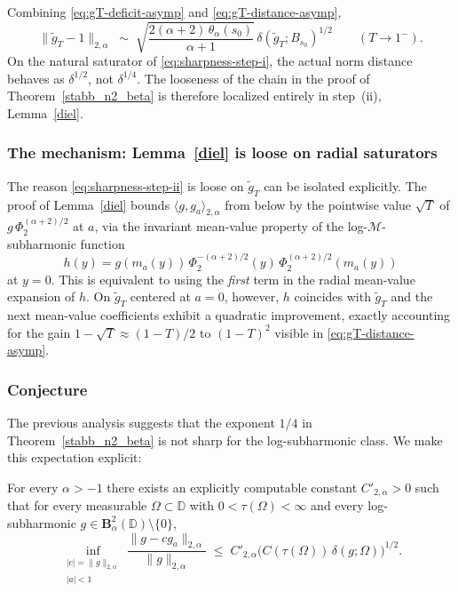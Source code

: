\documentclass[a4paper,10pt]{amsart}
\newcommand{\D}{\mathbb{D}}
\begin{document}
Combining \eqref{eq:gT-deficit-asymp} and \eqref{eq:gT-distance-asymp},
\[
\|\widetilde g_T-1\|_{2,\alpha}
\;\sim\;
\sqrt{\frac{2(\alpha+2)\,\theta_\alpha(s_0)}{\alpha+1}}\,
\delta(\widetilde g_T;B_{s_0})^{1/2}
\qquad (T\to 1^-).
\]
On the natural saturator of \eqref{eq:sharpness-step-i}, the actual norm
distance behaves as $\delta^{1/2}$, not $\delta^{1/4}$. The looseness of
the chain in the proof of Theorem~\ref{stabb_n2_beta} is therefore localized
entirely in step~(ii), Lemma~\ref{diel}.

\subsubsection*{The mechanism: Lemma~\ref{diel} is loose on radial saturators}

The reason \eqref{eq:sharpness-step-ii} is loose on $\widetilde g_T$ can be
isolated explicitly. The proof of Lemma~\ref{diel} bounds
$\langle g,g_a\rangle_{2,\alpha}$ from below by the pointwise value $\sqrt T$
of $g\,\Phi_2^{(\alpha+2)/2}$ at $a$, via the invariant mean-value property of
the log-$\mathcal M$-subharmonic function
\[
h(y)=g(m_a(y))\,\Phi_2^{-(\alpha+2)/2}(y)\,\Phi_2^{(\alpha+2)/2}(m_a(y))
\]
at $y=0$. This is equivalent to using the \emph{first} term in the radial
mean-value expansion of $h$. On $\widetilde g_T$ centered at $a=0$, however,
$h$ coincides with $\widetilde g_T$ and the next mean-value coefficients
exhibit a quadratic improvement, exactly accounting for the gain
$1-\sqrt T\approx (1-T)/2$ to $(1-T)^2$ visible in \eqref{eq:gT-distance-asymp}.

\subsubsection*{Conjecture}

The previous analysis suggests that the exponent $1/4$ in
Theorem~\ref{stabb_n2_beta} is not sharp for the log-subharmonic class.
We make this expectation explicit:

\begin{numconj}\label{conj:n2-half}
For every $\alpha>-1$ there exists an explicitly computable constant
$C'_{2,\alpha}>0$ such that for every measurable
$\Omega\subset\D$ with $0<\tau(\Omega)<\infty$ and every log-subharmonic
$g\in \mathbf B_\alpha^2(\D)\setminus\{0\}$,
\[
\inf_{\substack{|c|=\|g\|_{2,\alpha}\\|a|<1}}
\frac{\|g-cg_a\|_{2,\alpha}}{\|g\|_{2,\alpha}}
\;\le\;
C'_{2,\alpha}\bigl(C(\tau(\Omega))\,\delta(g;\Omega)\bigr)^{1/2}.
\]
\end{numconj}
\end{document}
